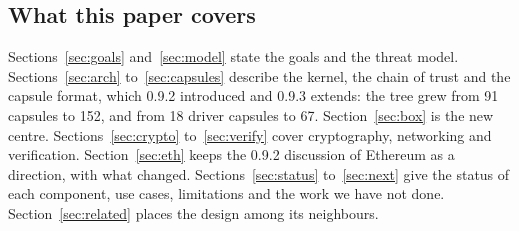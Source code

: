 \subsection{What this paper covers}

Sections~\ref{sec:goals} and~\ref{sec:model} state the goals and the threat model. Sections~\ref{sec:arch} to~\ref{sec:capsules} describe the kernel, the chain of trust and the capsule format, which 0.9.2 introduced and 0.9.3 extends: the tree grew from 91 capsules to 152, and from 18 driver capsules to 67. Section~\ref{sec:box} is the new centre. Sections~\ref{sec:crypto} to~\ref{sec:verify} cover cryptography, networking and verification. Section~\ref{sec:eth} keeps the 0.9.2 discussion of Ethereum as a direction, with what changed. Sections~\ref{sec:status} to~\ref{sec:next} give the status of each component, use cases, limitations and the work we have not done. Section~\ref{sec:related} places the design among its neighbours.
